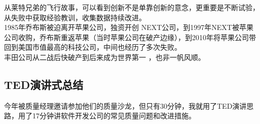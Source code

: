 从莱特兄弟的飞行故事，可以看到创新不是单靠创新的意念，更重要是不断试验，从失败中获取经验教训，收集数据持续改进。\\
1985年乔布斯被迫离开苹果公司，独资开创 NEXT公司，到1997年NEXT被苹果公司收购，乔布斯重返苹果（当时苹果公司在破产边缘），到2010年将苹果公司带回到美国市值最高的科技公司，中间也经历了多次失败。\\
丰田公司从二战后快破产到后来成为世界第一 ，也非一帆风顺。\\

\hypertarget{tedux6f14ux8bb2ux5f0fux603bux7ed3}{%
\subsection{TED演讲式总结}\label{tedux6f14ux8bb2ux5f0fux603bux7ed3}}

今年被质量经理邀请参加他们的质量沙龙，但只有30分钟，我就用了TED演讲思路，用了17分钟讲软件开发公司的常见质量问题和改进措施。

